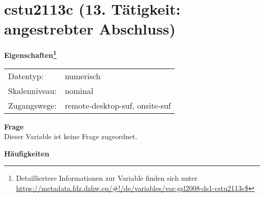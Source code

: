 
    \setcounter{footnote}{0}

    \vspace*{-1.8cm}
	\section{cstu2113c (13. Tätigkeit: angestrebter Abschluss)}
	\label{section:cstu2113c}



    \vspace*{0.5cm}
    \noindent\textbf{Eigenschaften\footnote{Detailliertere Informationen zur Variable finden sich unter
		\url{https://metadata.fdz.dzhw.eu/\#!/de/variables/var-gsl2008-ds1-cstu2113c$}}}\\
	\begin{tabularx}{\hsize}{@{}lX}
	Datentyp: & numerisch \\
	Skalenniveau: & nominal \\
	Zugangswege: &
	  remote-desktop-suf, 
	  onsite-suf
 \\
    \end{tabularx}



		\vspace*{0.5cm}
		\noindent\textbf{Frage}\\
		Dieser Variable ist keine Frage zugeordnet.





        		\vspace*{0.5cm}
                \noindent\textbf{Häufigkeiten}

